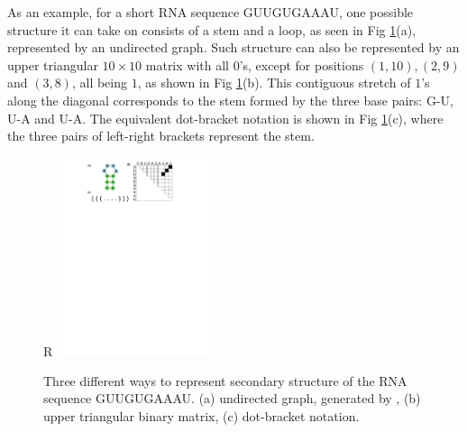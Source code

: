 \documentclass{article}
\begin{document}
As an example, for a short RNA sequence GUUGUGAAAU, one possible structure it can take on
consists of a stem and a loop, as seen in Fig \ref{fig:rna_ss_binary_mat}(a), represented by an undirected graph.
Such structure can also be represented by an upper triangular $10 \times 10$ matrix with all $0$'s,
except for positions
$(1, 10), (2, 9)$ and $(3, 8)$,
all being $1$, as shown in Fig \ref{fig:rna_ss_binary_mat}(b).
This contiguous stretch of $1$'s along the diagonal corresponds to the stem formed by the three base pairs: G-U, U-A and U-A.
The equivalent dot-bracket notation is shown in Fig \ref{fig:rna_ss_binary_mat}(c), where the three pairs
of left-right brackets represent the stem.


\begin{figure}{R}
        \centering
        \includegraphics[width=0.4\textwidth]{plot/rna_ss_binary_mat.pdf}
        \caption{Three different ways to represent secondary structure of the RNA sequence GUUGUGAAAU. (a) undirected graph, generated by \cite{kerpedjiev2015forna}, (b) upper triangular binary matrix, (c) dot-bracket notation.}
        \label{fig:rna_ss_binary_mat}
        \centering
\end{figure}

\end{document}
